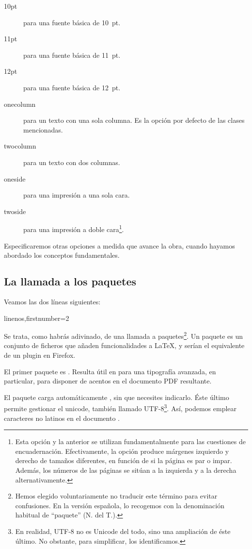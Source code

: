 \begin{description}
\item[10pt] para una fuente básica de 10~pt.
\item[11pt] para una fuente básica de 11~pt.
\item[12pt] para una fuente básica de 12~pt.
\item[onecolumn] para un texto con una sola columna. Es la opción por defecto de las clases mencionadas.
\item[twocolumn] para un texto con dos columnas.
\item[oneside] para una impresión a una sola cara. \label{nbsides}
\item[twoside] para una impresión a doble cara\footnote{Esta opción y la anterior se utilizan fundamentalmente para las cuestiones de encuadernación. Efectivamente, la opción  produce márgenes izquierdo y derecho de tamaños diferentes, en función de si la página es par o impar. Además, los números de las páginas se sitúan a la izquierda y a la derecha alternativamente.}.\label{rectoverso}
\end{description}

Especificaremos otras opciones a medida que avance la obra, cuando hayamos abordado los conceptos fundamentales.

\subsection{La llamada a los paquetes}

Veamos las dos líneas siguientes: 

\begin{latexcode*}{linenos,firstnumber=2}
\usepackage{fontspec}
\usepackage{polyglossia}
\end{latexcode*}

Se trata, como habrás adivinado, de una llamada a paquetes\footnote{Hemos elegido voluntariamente no traducir este término para evitar confusiones. En la versión española, lo recogemos con la denominación habitual de ``paquete'' (N. del T.).}. Un paquete es un conjunto de ficheros que añaden funcionalidades a \LaTeX, y serían el equivalente de un  plugin en Firefox. 

El primer paquete es . Resulta útil en \XeLaTeX  para una tipografía avanzada, en particular, para disponer de acentos en el documento PDF resultante. 

El paquete  carga automáticamente , sin que necesites indicarlo. Éste último permite gestionar el unicode, también llamado UTF-8\footnote{En realidad, UTF-8 no es Unicode del todo, sino una ampliación de éste último. No obstante, para simplificar, los identificamos.}. Así, podemos emplear caracteres no latinos en el documento .


